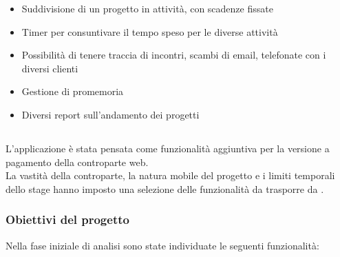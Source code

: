 \begin{itemize}
\item Suddivisione di un progetto in attività, con scadenze fissate
\item Timer per consuntivare il tempo speso per le diverse attività
\item Possibilità di tenere traccia di incontri, scambi di email, telefonate
con i diversi clienti
\item Gestione di promemoria
\item Diversi report sull'andamento dei progetti
\end{itemize}

\subsection{\fiscoloMobile}
L'applicazione è stata pensata come funzionalità aggiuntiva per la versione
a pagamento della controparte web. \\
La vastità della controparte, la natura mobile del progetto e i limiti temporali
dello stage hanno imposto una selezione delle funzionalità da trasporre da
\fiscoloWeb{}.

\subsubsection{Obiettivi del progetto}
Nella fase iniziale di analisi sono state individuate le seguenti funzionalità:

